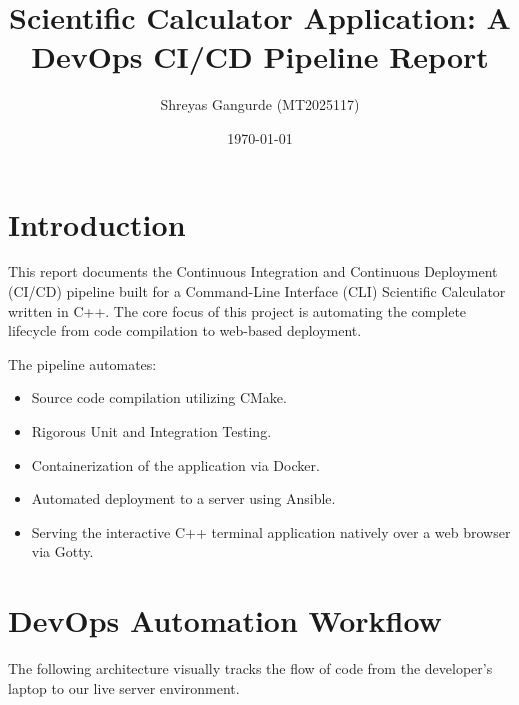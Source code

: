 \documentclass[12pt,a4paper]{article}
\title{Scientific Calculator Application: A DevOps CI/CD Pipeline Report}
\author{Shreyas Gangurde (MT2025117)}
\date{\today}
\begin{document}
\maketitle
\tableofcontents
\newpage

\section{Introduction}

This report documents the Continuous Integration and Continuous Deployment (CI/CD) pipeline built for a Command-Line Interface (CLI) Scientific Calculator written in C++. The core focus of this project is automating the complete lifecycle from code compilation to web-based deployment.

The pipeline automates:
\begin{itemize}
    \item Source code compilation utilizing CMake.
    \item Rigorous Unit and Integration Testing.
    \item Containerization of the application via Docker.
    \item Automated deployment to a server using Ansible.
    \item Serving the interactive C++ terminal application natively over a web browser via Gotty.
\end{itemize}

\section{DevOps Automation Workflow}
The following architecture visually tracks the flow of code from the developer's laptop to our live server environment.
\end{document}
